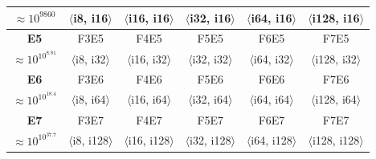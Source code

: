 \documentclass[12pt,letter]{article}
\begin{document}
\begin{table}[h!]
\begin{tabular}{|c|c|c|c|c|c|}
        \small{$\approx 10^{9860}$}      & \small{$\langle$i8, i16$\rangle$}                                                  & \small{$\langle$i16, i16$\rangle$}  & \small{$\langle$i32, i16$\rangle$}  & \small{$\langle$i64, i16$\rangle$}  & \small{$\langle$i128, i16$\rangle$}  \\
        \hline
        \textbf{E5}                      & F3E5                                                                               & F4E5                                & F5E5                                & F6E5                                & F7E5                                 \\
        \small{$\approx 10^{10^{8.81}}$} & \small{$\langle$i8, i32$\rangle$}                                                  & \small{$\langle$i16, i32$\rangle$}  & \small{$\langle$i32, i32$\rangle$}  & \small{$\langle$i64, i32$\rangle$}  & \small{$\langle$i128, i32$\rangle$}  \\
        \hline
        \textbf{E6}                      & F3E6                                                                               & F4E6                                & F5E6                                & F6E6                                & F7E6                                 \\
        \small{$\approx 10^{10^{18.4}}$} & \small{$\langle$i8, i64$\rangle$}                                                  & \small{$\langle$i16, i64$\rangle$}  & \small{$\langle$i32, i64$\rangle$}  & \small{$\langle$i64, i64$\rangle$}  & \small{$\langle$i128, i64$\rangle$}  \\
        \hline
        \textbf{E7}                      & F3E7                                                                               & F4E7                                & F5E7                                & F6E7                                & F7E7                                 \\
        \small{$\approx 10^{10^{37.7}}$} & \small{$\langle$i8, i128$\rangle$}                                                 & \small{$\langle$i16, i128$\rangle$} & \small{$\langle$i32, i128$\rangle$} & \small{$\langle$i64, i128$\rangle$} & \small{$\langle$i128, i128$\rangle$} \\
        \hline
    \end{tabular}
\end{table}
\end{document}
